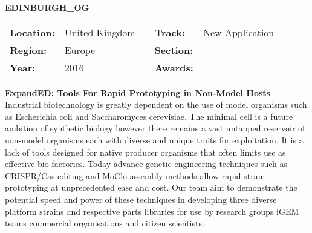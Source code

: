 \textbf{\uppercase{Edinburgh\_OG}} \FloatBarrier \begin{table}[h] \begin{tabular}{lp{2.5cm}llll} \textbf{Location:} & United Kingdom & \multicolumn{1}{|l}{} & \textbf{Track:}   & New Application \\ \textbf{Region:}   & Europe   & \multicolumn{1}{|l}{} & \textbf{Section:} &  \\ \textbf{Year:}     & 2016   & \multicolumn{1}{|l}{} & \textbf{Awards:}  & \end{tabular} \end{table} \FloatBarrier \noindent\textbf{ExpandED: Tools For Rapid Prototyping in Non-Model Hosts} \vspace{.2cm}\\ 
Industrial biotechnology is greatly dependent on the use of model organisms such as Escherichia coli and Saccharomyces cerevisiae. The minimal cell is a future ambition of synthetic biology however there remains a vast untapped reservoir of non-model organisms each with diverse and unique traits for exploitation. It is a lack of tools designed for native producer organisms that often limits use as effective bio-factories. Today advance genetic engineering techniques such as CRISPR/Cas editing and MoClo assembly methods allow rapid strain prototyping at unprecedented ease and cost. Our team aim to demonstrate the potential speed and power of these techniques in developing three diverse platform strains and respective parts libraries for use by research groups iGEM teams commercial organisations and citizen scientists.
\vspace{2cm} $ $
\pagebreak

